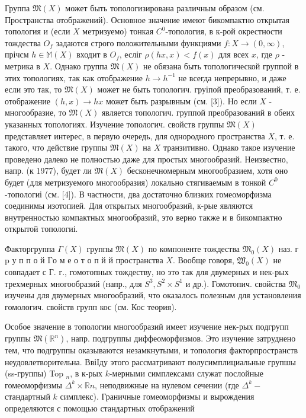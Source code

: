 \documentclass[10pt]{article}
\begin{document}
Группа $\mathfrak{M}(X)$ может быть топологизирована различным образом (см. Пространства отображений). Основное значение имеют бикомпактно открытая топология и (если $X$ метризуемо) тонкая $C^{0}$-топология, в к-рой окрестности тождества $O_{f}$ задаются строго положительными функциями $f: X \rightarrow(0, \infty)$, прічсм $h \in \mathbb{M}(X)$ входит в $O_{f}$, есліг $\rho(h x, x)<f(x)$ для всех $x$, где $\rho$ - метрика в $X$. Однако группа $\mathfrak{M}(X)$ не обязана быть топологической группой в этих топологиях, так как отображение $h \rightarrow h^{-1}$ не всегда непрерывно, и даже если это так, то $\mathfrak{M}(X)$ может не быть топологич. груіпой преобразований, т. е. отображение $(h, x) \rightarrow h x$ может быть разрывным (см. [3]). Но если $X$ - многообразие, то $\mathfrak{M}(X)$ является топологич. группой преобразований в обеих указанных топологиях. Изучение топологич. свойств группы $\mathfrak{M}(X)$ представляет интерес, в первую очередь, для однородного пространства $X$, т. е. такого, что действие группы $\mathfrak{M}(X)$ на $X$ транзитивно. Однако такое изучение проведено далеко не полностью даже для простых многообразий. Неизвестно, напр. (к 1977), будет ли $\mathfrak{M}(X)$ бесконечномерным многообразием, хотя оно будет (для метризуемого многообразия) локально стягиваемым в тонкой $C^{0}$-топологиі (см. [4]). В частности, два достаточно близких гомеоморфизма соединимы изотопией. Для открытых многообразий, к-рые являются внутренностью компактных многообразий, это верно также и в бикомпактно открытой топологиі.



Факторгруппа $\Gamma(X)$ группы $\mathfrak{M}(X)$ по компоненте тождества $\mathfrak{M}_{0}(X)$ наз. г $\mathrm{p}$ у п п о й $\mathrm{\Gamma} о$ м е о т о п й й пространства $X$. Вообще говоря, $\mathfrak{W}_{0}(X)$ не совпадает с Г. г., гомотопных тождеству, но это так для двумерных и нек-рых трехмерных многообразий (напр., для $S^{3}, S^{2} \times S^{1}$ и др.). Гомотопич. свойства $\mathfrak{M}_{0}$ изучены для двумерных многообразий, что оказалось полезным для установления гомологич. свойств групп кос (см. Кос теория).



Особое значение в топологии многообразий имеет изучение нек-рых подгрупп группы $\mathfrak{M}\left(\mathbb{R}^{n}\right)$, напр. подгруппы диффеоморфизмов. Это изучение затруднено тем, что подгруппы оказываются незамкнутыми, и топология факторпространств неудовлетворительна. ВвіІду этого рассматривают полусимплициальные групшы (ss-группы) Top ${ }_{n}$, в к-рых $k$-мерными симплексами служат послойные гомеоморфизмы $\Delta^{k} \times \mathbb{R} n$, неподвижные на нулевом сечении (где $\Delta^{k}-$ стандартный $k$ симплекс). Граничные гомеоморфизмы и вырождения определяются с помощью стандартных отображений
\end{document}

